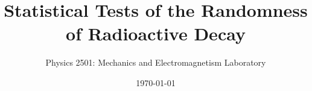 \documentclass{revtex4}
\begin{document}

\title{Statistical Tests of the Randomness of Radioactive Decay}


\author{Physics 2501: Mechanics and Electromagnetism Laboratory}


\date{\today}




\maketitle

\end{document}
